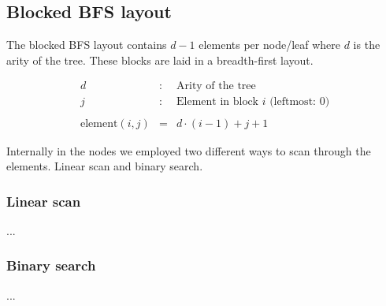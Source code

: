 
\subsection{Blocked BFS layout}

The blocked BFS layout contains $d - 1$ elements per node/leaf where $d$ is the arity of the tree. These blocks are laid in a breadth-first layout.

\begin{eqnarray*}
d & : & \textrm{Arity of the tree} \\
j & : & \textrm{Element in block $i$ (leftmost: $0$)} \\
\\
\mathrm{element}(i, j) & = & d\cdot (i - 1) + j + 1
\end{eqnarray*}


Internally in the nodes we employed two different ways to scan through the elements. Linear scan and binary search.


\subsubsection{Linear scan}

...

\subsubsection{Binary search}

...
